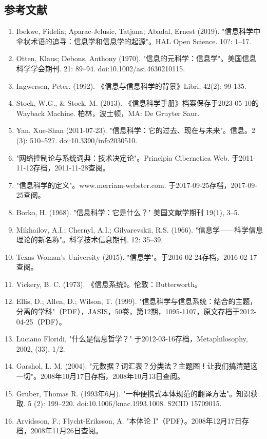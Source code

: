 \subsection{参考文献}  
\begin{enumerate}
\item Ibekwe, Fidelia; Aparac-Jelusic, Tatjana; Abadal, Ernest (2019). "信息科学中伞状术语的追寻：信息学和信息学的起源"。HAL Open Science. 10?: 1–17.  
\item Otten, Klaus; Debons, Anthony (1970). "信息的元科学：信息学"。美国信息科学学会期刊. 21: 89–94. doi:10.1002/asi.4630210115.  
\item Ingwersen, Peter. (1992). 《信息与信息科学的背景》Libri, 42(2): 99-135.  
\item Stock, W.G., & Stock, M. (2013). 《信息科学手册》档案保存于2023-05-10的Wayback Machine. 柏林，波士顿，MA: De Gruyter Saur.  
\item Yan, Xue-Shan (2011-07-23). "信息科学：它的过去、现在与未来"。信息。2 (3): 510–527. doi:10.3390/info2030510.  
\item "网络控制论与系统词典：技术决定论"。Principia Cibernetica Web. 于2011-11-12存档，2011-11-28查阅。  
\item "信息科学的定义"。www.merriam-webster.com. 于2017-09-25存档，2017-09-25查阅。  
\item Borko, H. (1968). "信息科学：它是什么？" 美国文献学期刊 19(1), 3–5.  
\item Mikhailov, A.I.; Chernyl, A.I.; Gilyarevskii, R.S. (1966). "信息学——科学信息理论的新名称"。科学技术信息期刊. 12: 35–39.  
\item Texas Woman's University (2015). "信息学"。于2016-02-24存档，2016-02-17查阅。  
\item Vickery, B. C. (1973). 《信息系统》。伦敦：Butterworth。  
\item Ellis, D.; Allen, D.; Wilson, T. (1999). "信息科学与信息系统：结合的主题，分离的学科"（PDF），JASIS，50卷，第12期，1095-1107，原文存档于2012-04-25（PDF）。  
\item Luciano Floridi, "什么是信息哲学？" 于2012-03-16存档，Metaphilosophy, 2002, (33), 1/2.  
\item Garshol, L. M. (2004). "元数据？词汇表？分类法？主题图！让我们搞清楚这一切"。2008年10月17日存档，2008年10月13日查阅。  
\item Gruber, Thomas R. (1993年6月). "一种便携式本体规范的翻译方法"。知识获取. 5 (2): 199–220. doi:10.1006/knac.1993.1008. S2CID 15709015.  
\item Arvidsson, F.; Flycht-Eriksson, A. "本体论 I"（PDF）。2008年12月17日存档，2008年11月26日查阅。  

\end{enumerate}
